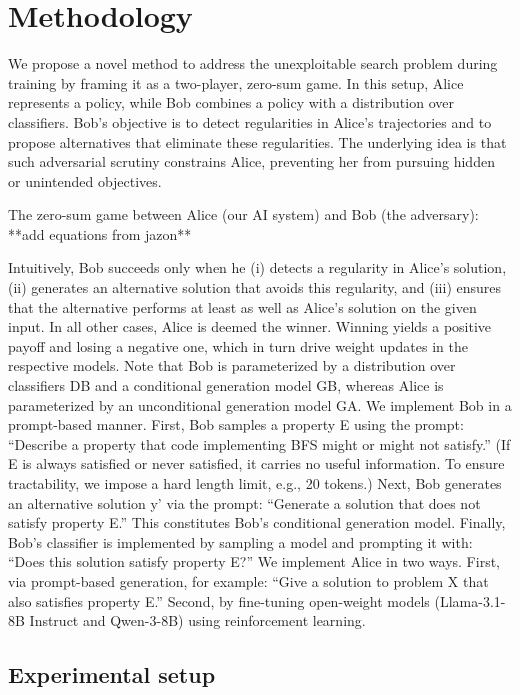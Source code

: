 \documentclass{article}
\begin{document}
\section{Methodology}
\label{headings}

We propose a novel method to address the unexploitable search problem during training by framing it as a two-player, zero-sum game. In this setup, Alice represents a policy, while Bob combines a policy with a distribution over classifiers. Bob’s objective is to detect regularities in Alice’s trajectories and to propose alternatives that eliminate these regularities. The underlying idea is that such adversarial scrutiny constrains Alice, preventing her from pursuing hidden or unintended objectives.

The zero-sum game between Alice (our AI system) and Bob (the adversary): **add equations from jazon**

Intuitively, Bob succeeds only when he (i) detects a regularity in Alice’s solution, (ii) generates an alternative solution that avoids this regularity, and (iii) ensures that the alternative performs at least as well as Alice’s solution on the given input. In all other cases, Alice is deemed the winner. Winning yields a positive payoff and losing a negative one, which in turn drive weight updates in the respective models.
Note that Bob is parameterized by a distribution over classifiers DB and a conditional generation model GB, whereas Alice is parameterized by an unconditional generation model GA.
We implement Bob in a prompt-based manner. First, Bob samples a property E using the prompt: “Describe a property that code implementing BFS might or might not satisfy.” (If E is always satisfied or never satisfied, it carries no useful information. To ensure tractability, we impose a hard length limit, e.g., 20 tokens.) Next, Bob generates an alternative solution y’ via the prompt: “Generate a solution that does not satisfy property E.” This constitutes Bob’s conditional generation model. Finally, Bob’s classifier is implemented by sampling a model and prompting it with: “Does this solution satisfy property E?”
We implement Alice in two ways. First, via prompt-based generation, for example: “Give a solution to problem X that also satisfies property E.” Second, by fine-tuning open-weight models (Llama-3.1-8B Instruct and Qwen-3-8B) using reinforcement learning.

\subsection{Experimental setup}
\end{document}
